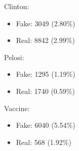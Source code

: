 \documentclass{l4proj}
\begin{document}
\begin{appendices}
Clinton:
\begin{itemize}
\item Fake: 3049 (2.80\%)
\item Real: 8842 (2.99\%)
\end{itemize}

Pelosi:
\begin{itemize}
\item Fake: 1295 (1.19\%)
\item Real: 1740 (0.59\%)
\end{itemize}

Vaccine:
\begin{itemize}
\item Fake: 6040 (5.54\%)
\item Real: 568 (1.92\%)
\end{itemize}

\end{appendices}





\renewcommand{\thechapter}{0} 

\end{document}
